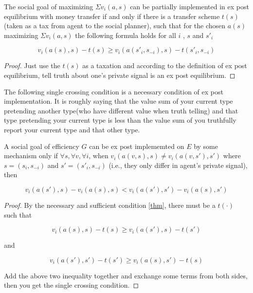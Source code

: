 \begin{thm} \label{necessary-sufficient}
The social goal of maximizing $\Sigma v_i(a, s)$ can be partially implemented in ex post equilibrium with money transfer if and only if there is a transfer scheme $t(s)$(taken as a tax from agent to the social planner), such that for 
the chosen $a(s)$ maximizing $\Sigma v_i(a, s)$ the following formula holds for all $i$ , $s$ and $s'_i$

\[v_i(a(s), s) - t(s) \geq v_i(a(s'_i, s_{-i}), s) - t(s'_i, s_{-i}) \]
\end{thm}
\begin{proof}
Just use the $t(s)$ as a taxation and according to the definition of ex post equilibrium,  tell truth about one's private signal is an ex post equilibrium.

\end{proof}
The following single crossing condition is a necessary condition of ex post implementation.
It is roughly saying that the value sum of your current type pretending another type(who have different value when truth telling)
and that type pretending your current type is less than the value sum of 
you truthfully report your current type and that other type.

\begin{prop}\label{prop}
A social goal of efficiency $G$ can be ex post implememted on $E$  by some mechanism only if $\forall s, \forall v, \forall i$, when 
$v_i(a(v,s), s)\neq v_i(a(v,s'),s')$ where  $s=(s_i, s_{-i})$ and 
$s'=(s'_i, s_{-i})$ (i.e., they only differ in agent's private signal), then

\begin{equation*}\label{equ}
v_i(a(s'),s)-v_i(a(s), s)<v_i(a(s'),s')-v_i(a(s), s')
\end{equation*}

\end{prop}

\begin{proof}
By the necessary and sufficient condition \ref{thm}, there must be a $t(\cdot)$ such that

\[v_i(a(s), s) - t(s) \geq v_i(a(s'), s) - t(s') \]

and

\[v_i(a(s'), s') - t(s') \geq v_i(a(s), s') - t(s) \]

Add the above two inequality together and exchange some terms from both sides, then you get the single crossing condition.


\end{proof}


